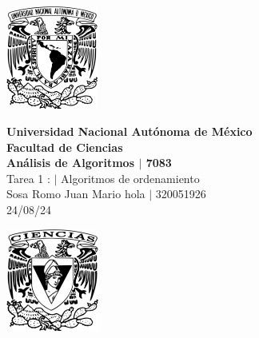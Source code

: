 \begin{center}
    \begin{minipage}{3cm}
    	\begin{center}
    		\includegraphics[height=3.4cm]{src/Img/Logo_UNAM.png}
    	\end{center}
    \end{minipage}\hfill
    \begin{minipage}{10cm}
    	\begin{center}
    	\textbf{\large Universidad Nacional Autónoma de México}\\[0.1cm]
        \textbf{Facultad de Ciencias}\\[0.1cm]
        \textbf{Análisis de Algoritmos  $|$ 7083}\\[0.1cm]
        Tarea 1 : $|$ Algoritmos de ordenamiento\\[0.1cm]
        Sosa Romo Juan Mario hola $|$ 320051926 \\[0.1cm]
        24/08/24
    	\end{center}
    \end{minipage}\hfill
    \begin{minipage}{3cm}
    	\begin{center}
    		\includegraphics[height=3.4cm]{src/Img/Logo_FC.png}
    	\end{center}
    \end{minipage}
\end{center}

